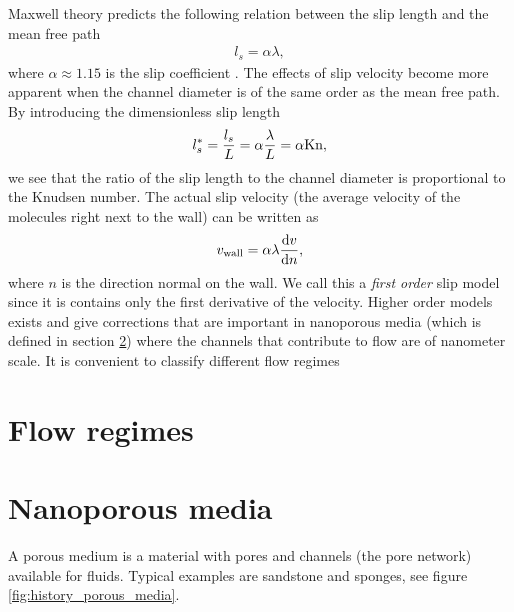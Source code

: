 Maxwell theory predicts the following relation between the slip length and the mean free path
\begin{align}
	\label{eq:noslip_sliplength}
	l_s = \alpha \lambda,
\end{align}
where $\alpha\approx 1.15$ is the slip coefficient \cite{morris1992slip}. The effects of slip velocity become more apparent when the channel diameter is of the same order as the mean free path. By introducing the dimensionless slip length
\begin{align}
	l_s^* = {l_s\over L} = \alpha {\lambda \over L} = \alpha \text{Kn},
\end{align}
we see that the ratio of the slip length to the channel diameter is proportional to the Knudsen number. The actual slip velocity (the average velocity of the molecules right next to the wall) can be written as
\begin{align}
	\label{eq:linear_slip_velocity}
	v_{\text{wall}} = \alpha\lambda\frac{\mathrm{d}v}{\mathrm{d}n},
\end{align}
where $n$ is the direction normal on the wall\cite{klinkenberg1941permeability}. We call this a \textit{first order} slip model since it is contains only the first derivative of the velocity. Higher order models exists and give corrections that are important in nanoporous media (which is defined in section \ref{sec:nanoporous_media}) where the channels that contribute to flow are of nanometer scale. It is convenient to classify different flow regimes 
\section{Flow regimes}
\section{Nanoporous media}
\label{sec:nanoporous_media}
A porous medium is a material with pores and channels (the pore network) available for fluids. Typical examples are sandstone and sponges, see figure \ref{fig:history_porous_media}. 
